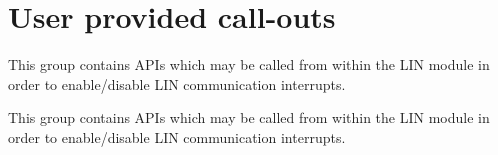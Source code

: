 \hypertarget{group__call__out__group}{}\section{User provided call-\/outs}
\label{group__call__out__group}


This group contains A\+P\+Is which may be called from within the L\+I\+N module in order to enable/disable L\+I\+N communication interrupts.  


This group contains A\+P\+Is which may be called from within the L\+I\+N module in order to enable/disable L\+I\+N communication interrupts. 

